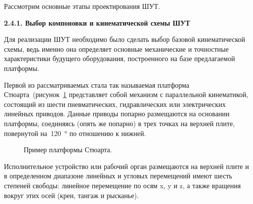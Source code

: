 Рассмотрим основные этапы проектирования ШУТ.

\textbf{2.4.1. Выбор компоновки и кинематической схемы ШУТ}

Для реализации ШУТ необходимо было сделать выбор базовой кинематической схемы, ведь именно она определяет основные механические и точностные характеристики будущего оборудования, построенного на базе предлагаемой платформы.

Первой из рассматриваемых стала так называемая платформа Стюарта~(рисунок~\cref{fig:stuart} представляет собой механизм с параллельной кинематикой, состоящий из шести пневматических, гидравлических или электрических линейных приводов. Данные приводы попарно размещаются на основании платформы, соединяясь (опять же попарно) в трех точках на верхней плите, повернутой на~\SI{120}{\degree} по отношению к нижней.

\begin{figure}[ht]
	\caption{Пример платформы Стюарта.}\label{fig:stuart}
\end{figure}

Исполнительное устройство или рабочий орган размещаются на верхней плите и в определенном диапазоне линейных и угловых перемещений имеют шесть степеней свободы: линейное перемещение по осям x, y и z, а также вращения вокруг этих осей (крен, тангаж и рысканье).

